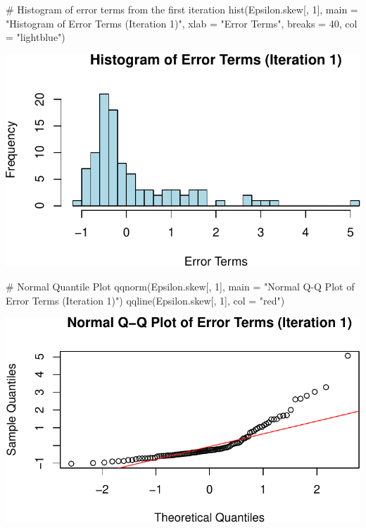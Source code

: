 \documentclass[
  11pt,
]{article}
\newenvironment{Shaded}{\begin{snugshade}}{\end{snugshade}}
\newcommand{\AttributeTok}[1]{\textcolor[rgb]{0.40,0.45,0.13}{#1}}
\newcommand{\CommentTok}[1]{\textcolor[rgb]{0.37,0.37,0.37}{#1}}
\newcommand{\DecValTok}[1]{\textcolor[rgb]{0.68,0.00,0.00}{#1}}
\newcommand{\FunctionTok}[1]{\textcolor[rgb]{0.28,0.35,0.67}{#1}}
\newcommand{\NormalTok}[1]{\textcolor[rgb]{0.00,0.23,0.31}{#1}}
\newcommand{\StringTok}[1]{\textcolor[rgb]{0.13,0.47,0.30}{#1}}
\begin{document}
\begin{Shaded}
\begin{Highlighting}[]
\CommentTok{\# Histogram of error terms from the first iteration}
\FunctionTok{hist}\NormalTok{(Epsilon.skew[, }\DecValTok{1}\NormalTok{], }\AttributeTok{main =} \StringTok{"Histogram of Error Terms (Iteration 1)"}\NormalTok{,}
     \AttributeTok{xlab =} \StringTok{"Error Terms"}\NormalTok{, }\AttributeTok{breaks =} \DecValTok{40}\NormalTok{, }\AttributeTok{col =} \StringTok{"lightblue"}\NormalTok{)}
\end{Highlighting}
\end{Shaded}

\includegraphics{HW-4-CODE-and-ANSWERS_files/figure-pdf/unnamed-chunk-11-1.pdf}

\begin{Shaded}
\begin{Highlighting}[]
\CommentTok{\# Normal Quantile Plot}
\FunctionTok{qqnorm}\NormalTok{(Epsilon.skew[, }\DecValTok{1}\NormalTok{], }\AttributeTok{main =} \StringTok{"Normal Q{-}Q Plot of Error Terms (Iteration 1)"}\NormalTok{)}
\FunctionTok{qqline}\NormalTok{(Epsilon.skew[, }\DecValTok{1}\NormalTok{], }\AttributeTok{col =} \StringTok{"red"}\NormalTok{)}
\end{Highlighting}
\end{Shaded}

\includegraphics{HW-4-CODE-and-ANSWERS_files/figure-pdf/unnamed-chunk-11-2.pdf}
\end{document}
